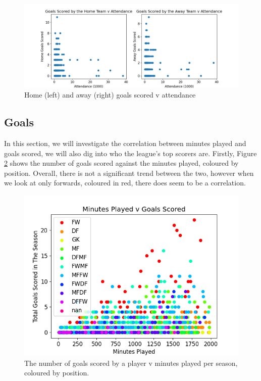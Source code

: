 \documentclass[12pt, a4paper, twocolumn]{article}
\begin{document}
\begin{figure}
  \includegraphics[width=\linewidth]{../vis/fixtures/attendance_v_goals.png}
  \caption{Home (left) and away (right) goals scored v attendance}
  \label{att_v_goals}
\end{figure}

\subsection{Goals}

In this section, we will investigate the correlation between minutes played and goals scored, we will also dig into who the league's top scorers are. Firstly, Figure \ref{goal_min} shows the number of goals scored against the minutes played, coloured by position. Overall, there is not a significant trend between the two, however when we look at only forwards, coloured in red, there does seem to be a correlation.

\begin{figure}
  \includegraphics[width=\linewidth]{../vis/playerStats/goal_minutes}
  \caption{The number of goals scored by a player v minutes played per season, coloured by position.}
  \label{goal_min}
\end{figure}
\end{document}
